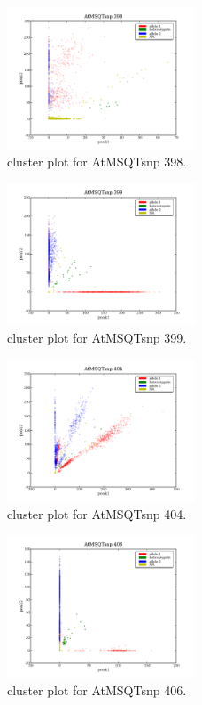 \begin{figure}[H]
\includegraphics[width=0.5\textwidth]{figures/cluster_plot_AtMSQTsnp_398.png}
\caption{cluster plot for AtMSQTsnp 398.} \label{flAtMSQTsnp398}
\end{figure}
\begin{figure}[H]
\includegraphics[width=0.5\textwidth]{figures/cluster_plot_AtMSQTsnp_399.png}
\caption{cluster plot for AtMSQTsnp 399.} \label{flAtMSQTsnp399}
\end{figure}
\begin{figure}[H]
\includegraphics[width=0.5\textwidth]{figures/cluster_plot_AtMSQTsnp_404.png}
\caption{cluster plot for AtMSQTsnp 404.} \label{flAtMSQTsnp404}
\end{figure}
\begin{figure}[H]
\includegraphics[width=0.5\textwidth]{figures/cluster_plot_AtMSQTsnp_406.png}
\caption{cluster plot for AtMSQTsnp 406.} \label{flAtMSQTsnp406}
\end{figure}
